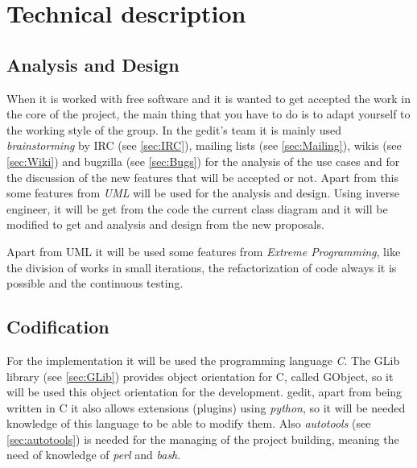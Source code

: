 
\chapter{Technical description}


\section{Analysis and Design}\label{sec:AnalysisDesign}

When it is worked with free software and it is wanted to get accepted the work in the core of the project, the main thing that you have to do is to adapt yourself to the working style of the group. In the gedit's team it is mainly used \emph{brainstorming} by IRC (see \ref{sec:IRC}), mailing lists (see \ref{sec:Mailing}), wikis (see \ref{sec:Wiki}) and bugzilla (see \ref{sec:Bugs}) for the analysis of the use cases and for the discussion of the new features that will be accepted or not. Apart from this some features from \emph{UML} will be used for the analysis and design. Using inverse engineer, it will be get from the code the current class diagram and it will be modified to get and analysis and design from the new proposals.

Apart from UML it will be used some features from \emph{Extreme Programming}, like the division of works in small iterations, the refactorization of code always it is possible and the continuous testing.

\section{Codification}\label{sec:Codification}

For the implementation it will be used the programming language \emph{C}. The GLib library (see \ref{sec:GLib}) provides object orientation for C, called GObject, so it will be used this object orientation for the development. gedit, apart from being written in C it also allows extensions (plugins) using \emph{python}, so it will be needed knowledge of this language to be able to modify them. Also \emph{autotools} (see \ref{sec:autotools}) is needed for the managing of the project building, meaning the need of knowledge of \emph{perl} and \emph{bash}.
